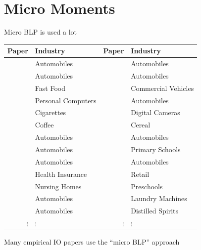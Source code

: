 \documentclass[aspectratio=169,10pt]{beamer}
\begin{document}
\section{Micro Moments}

\begin{frame}{Micro BLP is used a lot}
    \vspace{0.5em}
    \scriptsize
    \begin{tabular}{rlrl}
        Paper & Industry & Paper & Industry \\
        \midrule
        \cite*{petrin2002quantifying} & Automobiles & \cite*{barwick2017local} & Automobiles \\
        \cite*{berry2004differentiated} & Automobiles & \cite*{murry2017advertising} & Automobiles \\
        \cite*{thomadsen2005effect} & Fast Food & \cite*{wollmann2018trucks} & Commercial Vehicles \\
        \cite*{goeree2008limited} & Personal Computers & \cite*{li2018better} & Automobiles \\
        \cite*{ciliberto2010public} & Cigarettes & \cite*{li2018empirical} & Digital Cameras \\
        \cite*{nakamura2010accounting} & Coffee & \cite*{backus2021common} & Cereal \\
        \cite*{beresteanu2011gasoline} & Automobiles & \cite*{grieco2021evolution} & Automobiles \\
        \cite*{li2012traffic} & Automobiles & \cite*{neilson2021targeted} & Primary Schools \\
        \cite*{copeland2014intertemporal} & Automobiles & \cite*{armitage2022regulatory} & Automobiles \\
        \cite*{starc2014insurer} & Health Insurance & \cite*{dopper2022rising} & Retail \\
        \cite*{ching2015quantifying} & Nursing Homes & \cite*{bodere2023dynamic} & Preschools \\
        \cite*{li2015price} & Automobiles & \cite*{montag2023mergers} & Laundry Machines \\
        \cite*{nurski2016exclusive} & Automobiles & \cite*{conlon2023market} & Distilled Spirits \\
        $\vdots$ & $\vdots$ & $\vdots$ & $\vdots$
    \end{tabular}
    \normalsize
    \vspace{0.5em}
    \begin{wideitemize}
        \item Many empirical IO papers use the ``micro BLP'' approach

\end{wideitemize}
\end{frame}
\end{document}
